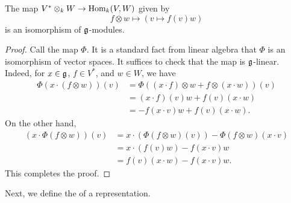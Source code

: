 \begin{proposition}
    The map $V^\ast\otimes_k W\to\operatorname{Hom}_k(V, W)$ given by 
    \begin{equation*}
        f\otimes w\longmapsto\left(v\mapsto f(v)w\right)
    \end{equation*}
    is an isomorphism of $\mathfrak{g}$-modules.
\end{proposition}
\begin{proof}
    Call the map $\Phi$. It is a standard fact from linear algebra that $\Phi$ is an isomorphism of vector spaces. It suffices to check that the map is $\mathfrak{g}$-linear. Indeed, for $x\in\mathfrak{g}$, $f\in V^\ast$, and $w\in W$, we have 
    \begin{align*}
        \Phi(x\cdot (f\otimes w))(v) &= \Phi\left((x\cdot f)\otimes w + f\otimes(x\cdot w)\right)(v)\\
        &= (x\cdot f)(v)w + f(v)(x\cdot w)\\
        &= -f(x\cdot v)w + f(v)(x\cdot w).
    \end{align*}
    On the other hand, 
    \begin{align*}
        (x\cdot\Phi(f\otimes w))(v) &= x\cdot\left(\Phi(f\otimes w)(v)\right) - \Phi(f\otimes w)(x\cdot v)\\
        &= x\cdot\left(f(v) w\right) - f(x\cdot v)w\\ 
        &= f(v)(x\cdot w) - f(x\cdot v)w.
    \end{align*}
    This completes the proof.
\end{proof}

Next, we define the  of a representation.